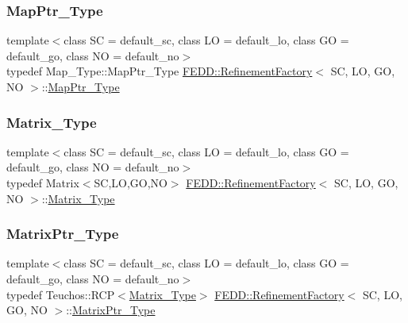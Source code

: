 \subsubsection{\texorpdfstring{Map\+Ptr\+\_\+\+Type}{MapPtr\_Type}}
{\footnotesize\ttfamily template$<$class SC = default\+\_\+sc, class LO = default\+\_\+lo, class GO = default\+\_\+go, class NO = default\+\_\+no$>$ \\
typedef Map\+\_\+\+Type\+::\+Map\+Ptr\+\_\+\+Type \hyperlink{classFEDD_1_1RefinementFactory}{F\+E\+D\+D\+::\+Refinement\+Factory}$<$ SC, LO, GO, NO $>$\+::\hyperlink{classFEDD_1_1RefinementFactory_a554f7a4c5f5014e2ddec03a2e667016c}{Map\+Ptr\+\_\+\+Type}}

\mbox{\label{classFEDD_1_1RefinementFactory_ab04c3bb37b70c0524f46b050aaec1914}} 
\subsubsection{\texorpdfstring{Matrix\+\_\+\+Type}{Matrix\_Type}}
{\footnotesize\ttfamily template$<$class SC = default\+\_\+sc, class LO = default\+\_\+lo, class GO = default\+\_\+go, class NO = default\+\_\+no$>$ \\
typedef Matrix$<$SC,LO,GO,NO$>$ \hyperlink{classFEDD_1_1RefinementFactory}{F\+E\+D\+D\+::\+Refinement\+Factory}$<$ SC, LO, GO, NO $>$\+::\hyperlink{classFEDD_1_1RefinementFactory_ab04c3bb37b70c0524f46b050aaec1914}{Matrix\+\_\+\+Type}}

\mbox{\label{classFEDD_1_1RefinementFactory_a52d5a6625f207bc4df2c5ae3362e8ced}} 
\subsubsection{\texorpdfstring{Matrix\+Ptr\+\_\+\+Type}{MatrixPtr\_Type}}
{\footnotesize\ttfamily template$<$class SC = default\+\_\+sc, class LO = default\+\_\+lo, class GO = default\+\_\+go, class NO = default\+\_\+no$>$ \\
typedef Teuchos\+::\+R\+CP$<$\hyperlink{classFEDD_1_1RefinementFactory_ab04c3bb37b70c0524f46b050aaec1914}{Matrix\+\_\+\+Type}$>$ \hyperlink{classFEDD_1_1RefinementFactory}{F\+E\+D\+D\+::\+Refinement\+Factory}$<$ SC, LO, GO, NO $>$\+::\hyperlink{classFEDD_1_1RefinementFactory_a52d5a6625f207bc4df2c5ae3362e8ced}{Matrix\+Ptr\+\_\+\+Type}}

